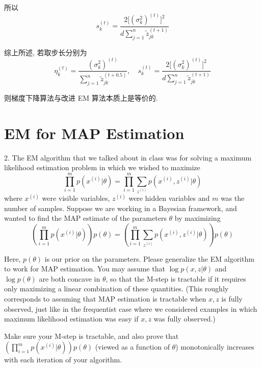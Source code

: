 \documentclass{article}
\begin{document}
所以
\begin{equation}
  s_k^{(t)}=\frac{2\big[(\sigma_k^2)^{(t)}\big]^2}{\displaystyle d\sum_{j=1}^n\tilde{z}_{jk}^{(t+1)}}
\end{equation}

综上所述, 若取步长分别为
\begin{equation}
  \eta_k^{(t)}=\frac{(\sigma_k ^2)^{(t)}}{\displaystyle\sum_{j=1}^n\tilde{z}_{jk}^{(t+0.5)}},\quad s_k^{(t)}=\frac{2\big[(\sigma_k^2)^{(t)}\big]^2}{\displaystyle d\sum_{j=1}^n\tilde{z}_{jk}^{(t+1)}}
\end{equation}

则梯度下降算法与改进 EM 算法本质上是等价的.

\section*{EM for MAP Estimation}

2. The EM algorithm that we talked about in class was for solving a maximum likelihood estimation problem in which we wished to maximize
\begin{equation}
  \prod_{i = 1}^mp(x^{(i)}|\theta) = \prod_{i = 1}^m \sum_{z^{(i)}}p(x^{(i)},z^{(i)}|\theta)
\end{equation}
where $x^{(i)}$ were visible variables, $z^{(i)}$ were hidden variables and $m$ was the number of samples. Suppose we are working in a Bayesian framework, and wanted to find the MAP estimate of the parameters $\theta$ by maximizing
\begin{equation}
  \left(\prod_{i = 1}^mp(x^{(i)}|\theta)\right)p(\theta) = \left(\prod_{i = 1}^m \sum_{z^{(i)}}p(x^{(i)},z^{(i)}|\theta)\right)p(\theta)
  \label{eq:llhmap}
\end{equation}

Here, $p(\theta)$ is our prior on the parameters. Please generalize the EM algorithm to work for MAP estimation. You may assume that $\log p(x,z|\theta)$ and $\log p(\theta)$ are both concave in $\theta$, so that the M-step is tractable if it requires only maximizing a linear combination of these quantities. (This roughly corresponds to assuming that MAP estimation is tractable when $x, z$ is fully observed, just like in the frequentist case where we considered examples in which maximum likelihood estimation was easy if $x, z$ was fully observed.)

Make sure your M-step is tractable, and also prove that $\displaystyle\left(\prod_{i = 1}^mp(x^{(i)}|\theta)\right)p(\theta)$ (viewed as a function of $\theta$) monotonically increases with each iteration of your algorithm.
\end{document}
